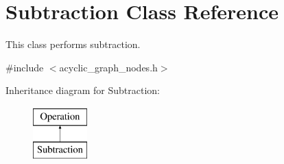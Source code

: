\hypertarget{classSubtraction}{}\section{Subtraction Class Reference}
\label{classSubtraction}


This class performs subtraction.  




{\ttfamily \#include $<$acyclic\+\_\+graph\+\_\+nodes.\+h$>$}

Inheritance diagram for Subtraction\+:\begin{figure}[H]
\begin{center}
\leavevmode
\includegraphics[height=2.000000cm]{classSubtraction}
\end{center}
\end{figure}
